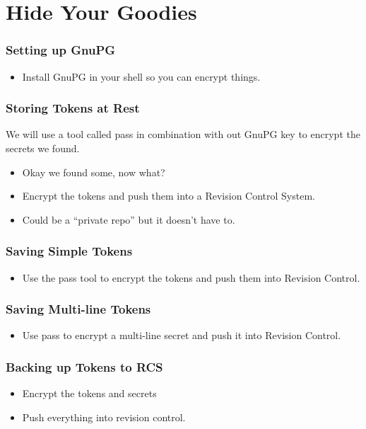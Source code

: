 \documentclass[aspectratio=169]{beamer}
\makeatletter
\def\sectionsubtitle#1{\gdef\@sectionsubtitle{#1}}
\gdef\@sectionsubtitle{}
\makeatother
\begin{document}
\sectionsubtitle{We found the secrets, now what?}
\section{Hide Your Goodies}

\begin{frame}
    \frametitle{Setting up GnuPG}
    \begin{itemize}
        \item Install GnuPG in your shell so you can encrypt things.
    \end{itemize}
\end{frame}

\begin{frame}
	\frametitle{Storing Tokens at Rest}
    We will use a tool called pass in combination with out GnuPG key to encrypt the secrets we found.
	\begin{itemize}
        \item Okay we found some, now what?
		\item Encrypt the tokens and push them into a Revision Control System.
        \item Could be a ``private repo'' but it doesn't have to.
	\end{itemize}
\end{frame}

\begin{frame}
	\frametitle{Saving Simple Tokens}
	\begin{itemize}
		\item Use the pass tool to encrypt the tokens and push them into Revision Control.
	\end{itemize}
\end{frame}

\begin{frame}
	\frametitle{Saving Multi-line Tokens}
	\begin{itemize}
		\item Use pass to encrypt a multi-line secret and push it into Revision Control.
	\end{itemize}
\end{frame}

\begin{frame}
	\frametitle{Backing up Tokens to RCS}
	\begin{itemize}
		\item Encrypt the tokens and secrets
		\item Push everything into revision control.
	\end{itemize}
\end{frame}
\end{document}

